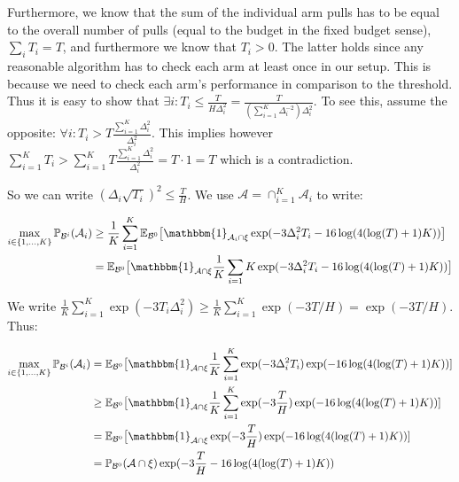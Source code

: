\documentclass[12pt,]{article}
\begin{document}
Furthermore, we know that the sum of the individual arm pulls has to be
equal to the overall number of pulls (equal to the budget in the fixed
budget sense), \(\sum_i T_i = T\), and furthermore we know that
\(T_i>0\). The latter holds since any reasonable algorithm has to check
each arm at least once in our setup. This is because we need to check
each arm's performance in comparison to the threshold. Thus it is easy
to show that
\(\exists i: T_i \leq \frac{T}{H \Delta_i^2} = \frac{T}{(\sum_{i=1}^{K} \Delta_i^{-2}) \Delta_i^2}\).
To see this, assume the opposite:
\(\forall i: T_i > T \frac{\sum_{i=1}^K \Delta_i^2}{\Delta_i^2}\). This
implies however
\(\sum_{i=1}^K T_i > \sum_{i=1}^K T \frac{\sum_{i=1}^K \Delta_i^2}{\Delta_i^2} = T \cdot 1 = T\)
which is a contradiction.

So we can write \((\Delta_i \sqrt{T_i})^2 \leq \frac{T}{H}\). We use
\(\mathcal{A} = \cap_{i=1}^K \mathcal{A}_i\) to write:

\begin{align*}
\max_{i \in \{1,\dots,K\}} \mathbb{P}_{\mathcal{B}^i}(\mathcal{A}_i) & \geq \frac{1}{K} \sum_{i=1}^{K} \mathbb{E}_{\mathcal{B}^0} \big[\mathbbm{1}_{\mathcal{A}_i \cap \xi} \exp (- 3 \Delta_i^2 T_i - 16 \log(4(\log(T)+1)K)) \big] \\
& = \mathbb{E}_{\mathcal{B}^0} \big[\mathbbm{1}_{\mathcal{A} \cap \xi} \frac{1}{K} \sum_{i=1}{K} \exp (- 3 \Delta_i^2 T_i - 16 \log(4(\log(T)+1)K)) \big]
\end{align*}

We write
\(\frac{1}{K} \sum_{i=1}^K \exp(-3T_i \Delta_i^2) \geq \frac{1}{K} \sum_{i=1}^K \exp(-3 T/H) = \exp(-3 T/H)\).
Thus:

\begin{align*}
\max_{i \in \{1,\dots,K\}} \mathbb{P}_{\mathcal{B}^i}(\mathcal{A}_i) & = \mathbb{E}_{\mathcal{B}^0} \big[\mathbbm{1}_{\mathcal{A} \cap \xi} \frac{1}{K} \sum_{i=1}^{K} \exp (- 3 \Delta_i^2 T_i) \exp(-16 \log(4(\log(T)+1)K)) ] \\
& \geq \mathbb{E}_{\mathcal{B}^0} \big[\mathbbm{1}_{\mathcal{A} \cap \xi} \frac{1}{K} \sum_{i=1}^{K} \exp (- 3 \frac{T}{H}) \exp(-16 \log(4(\log(T)+1)K)) ] \\
& = \mathbb{E}_{\mathcal{B}^0} \big[\mathbbm{1}_{\mathcal{A} \cap \xi} \exp (- 3 \frac{T}{H}) \exp(-16 \log(4(\log(T)+1)K)) ] \\
& = \mathbb{P}_{\mathcal{B}^0} (\mathcal{A} \cap \xi) \exp (- 3 \frac{T}{H} -16 \log(4(\log(T)+1)K))
\end{align*}
\end{document}
